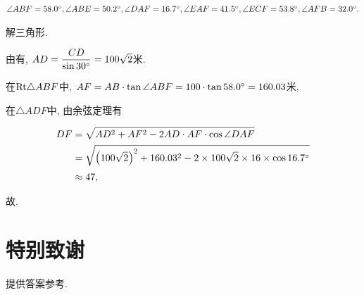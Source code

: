 \documentclass[8pt]{article}
\begin{document}
\begin{enumerate}[label = \calword{(\arabic*)}]
				\(\angle ABF = 58.0^\circ, \angle ABE = 50.2^\circ, \angle DAF = 16.7^\circ, \angle EAF = 41.5^\circ, \angle ECF = 53.8^\circ, \angle AFB = 32.0^\circ.\)

				 解三角形.

				由有, \(AD = \dfrac{CD}{\sin 30^\circ} = 100\sqrt{2}\)米.

				在\(\mathrm{Rt} \triangle ABF\)中, \(AF = AB \cdot \tan \angle ABF = 100 \cdot \tan 58.0 ^\circ = 160.03\)米,

				在\(\triangle ADF\)中, 由余弦定理有

				\begin{align*}
					DF &= \sqrt{AD^2 + AF^2 - 2 AD \cdot AF \cdot \cos \angle DAF}\\
					   &= \sqrt{\left(100 \sqrt{2}\right)^2 + 160.03^2 - 2 \times 100\sqrt{2} \times 16 \times \cos 16.7 ^\circ}\\
					   &\approx 47,
				\end{align*}

				故.

		\end{enumerate}

	\section{特别致谢}
		 提供答案参考.
\end{document}
